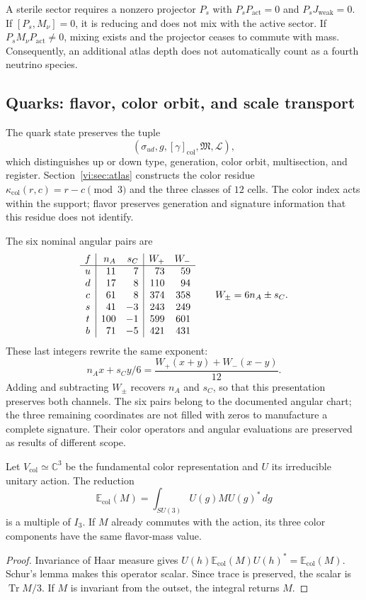 A sterile sector requires a nonzero projector \(P_s\) with
\(P_sP_{\mathrm{act}}=0\) and \(P_sJ_{\mathrm{weak}}=0\).
If \([P_s,M_\nu]=0\), it is reducing and does not mix with the active sector.
If \(P_sM_\nu P_{\mathrm{act}}\ne0\), mixing exists and the projector
ceases to commute with mass. Consequently, an additional atlas depth
does not automatically count as a fourth neutrino species.

\subsection{Quarks: flavor, color orbit, and scale transport}
\label{vi:subsec:quarks-familias}

The quark state preserves the tuple
\[
 (\sigma_{ud},g,[\gamma]_{\mathrm{col}},\mathfrak M,\mathscr L),
\]
which distinguishes up or down type, generation, color orbit,
multisection, and register. Section~\ref{vi:sec:atlas} constructs the
color residue \(\kappa_{\mathrm{col}}(r,c)=r-c\pmod3\) and the
three classes of \(12\) cells. The color index acts within the
support; flavor preserves generation and signature information that this
residue does not identify.

The six nominal angular pairs are
\[
\begin{array}{c|r r|r r}
 f&n_A&s_C&W_+&W_-\\\hline
 u&11&7&73&59\\
 d&17&8&110&94\\
 c&61&8&374&358\\
 s&41&-3&243&249\\
 t&100&-1&599&601\\
 b&71&-5&421&431
\end{array}
\qquad W_\pm=6n_A\pm s_C.
\]
These last integers rewrite the same exponent:
\[
 n_Ax+s_Cy/6
 =\frac{W_+(x+y)+W_-(x-y)}{12}.
\]
Adding and subtracting \(W_\pm\) recovers \(n_A\) and \(s_C\), so that
this presentation preserves both channels. The six pairs belong
to the documented angular chart; the three remaining coordinates are not
filled with zeros to manufacture a complete signature. Their color
operators and angular evaluations are preserved as results of
different scope.

\begin{proposition}
\label{vi:prop:masa-color}
Let \(V_{\mathrm{col}}\simeq\mathbb C^3\) be the fundamental color
representation and \(U\) its irreducible unitary action. The reduction
\[
 \mathbb E_{\mathrm{col}}(M)=
 \int_{SU(3)}U(g)MU(g)^*\,dg
\]
is a multiple of \(I_3\). If \(M\) already commutes with the action, its three
color components have the same flavor-mass value.
\end{proposition}
\begin{proof}
Invariance of Haar measure gives
\(U(h)\mathbb E_{\mathrm{col}}(M)U(h)^*=
\mathbb E_{\mathrm{col}}(M)\). Schur's lemma makes this
operator scalar. Since trace is preserved, the scalar is
\(\operatorname{Tr}M/3\). If \(M\) is invariant from the outset,
the integral returns \(M\).
\end{proof}

